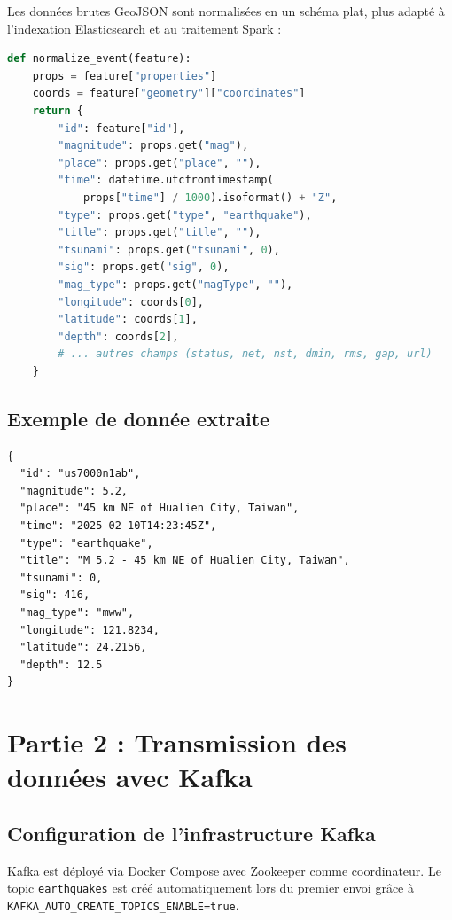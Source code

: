 \documentclass[12pt,a4paper]{article}
\begin{document}
Les données brutes GeoJSON sont normalisées en un schéma plat, plus adapté à l'indexation Elasticsearch et au traitement Spark :

\begin{lstlisting}[language=Python, caption={Normalisation d'un événement GeoJSON}]
def normalize_event(feature):
    props = feature["properties"]
    coords = feature["geometry"]["coordinates"]
    return {
        "id": feature["id"],
        "magnitude": props.get("mag"),
        "place": props.get("place", ""),
        "time": datetime.utcfromtimestamp(
            props["time"] / 1000).isoformat() + "Z",
        "type": props.get("type", "earthquake"),
        "title": props.get("title", ""),
        "tsunami": props.get("tsunami", 0),
        "sig": props.get("sig", 0),
        "mag_type": props.get("magType", ""),
        "longitude": coords[0],
        "latitude": coords[1],
        "depth": coords[2],
        # ... autres champs (status, net, nst, dmin, rms, gap, url)
    }
\end{lstlisting}

\subsection{Exemple de donnée extraite}

\begin{lstlisting}[style=json, caption={Exemple d'événement sismique normalisé}]
{
  "id": "us7000n1ab",
  "magnitude": 5.2,
  "place": "45 km NE of Hualien City, Taiwan",
  "time": "2025-02-10T14:23:45Z",
  "type": "earthquake",
  "title": "M 5.2 - 45 km NE of Hualien City, Taiwan",
  "tsunami": 0,
  "sig": 416,
  "mag_type": "mww",
  "longitude": 121.8234,
  "latitude": 24.2156,
  "depth": 12.5
}
\end{lstlisting}

\section{Partie 2 : Transmission des données avec Kafka}

\subsection{Configuration de l'infrastructure Kafka}

Kafka est déployé via Docker Compose avec Zookeeper comme coordinateur. Le topic \texttt{earthquakes} est créé automatiquement lors du premier envoi grâce à \texttt{KAFKA\_AUTO\_CREATE\_TOPICS\_ENABLE=true}.
\end{document}
